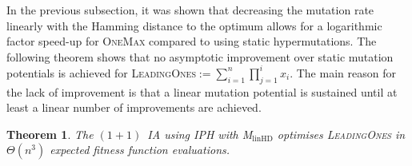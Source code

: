 \documentclass[lettersize,journal]{IEEEtran}
\newcommand{\oneoneIA}{$(1+1)$~IA}
\newcommand{\linHD}{M$_{\text{linHD}}$}
\newcommand{\IPHfcm}{IPH}
\newtheorem{theorem}{Theorem}
\begin{document}
In the previous subsection, it was shown that decreasing the mutation rate linearly with the Hamming distance to the optimum allows for a logarithmic factor speed-up for \textsc{OneMax} compared to using  static hypermutations. The following theorem shows that no asymptotic improvement over static mutation potentials is achieved for \textsc{LeadingOnes}$:= \sum_{i=1}^{n}\prod_{j=1}^{i}x_i$. The main reason for the lack of improvement is that a linear mutation potential is sustained until at least a linear number of improvements are achieved.


\begin{theorem} \label{th:linHD-LO}
The {\oneoneIA } using \IPHfcm{} with {\linHD } optimises \textsc{LeadingOnes} in $\Theta(n^3)$ expected fitness function evaluations.
\end{theorem}
\end{document}
